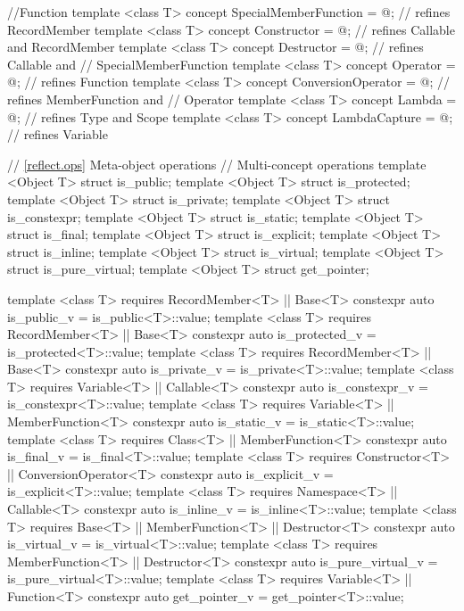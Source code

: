 \begin{std.txt}
\begin{codeblock}
{{                                                       //Function
template <class T> concept SpecialMemberFunction = @\seebelow@; // refines RecordMember
template <class T> concept Constructor = @\seebelow@;    // refines Callable and RecordMember
template <class T> concept Destructor = @\seebelow@;     // refines Callable and
                                                       // SpecialMemberFunction
template <class T> concept Operator = @\seebelow@;       // refines Function
template <class T> concept ConversionOperator = @\seebelow@; // refines MemberFunction and
                                                           // Operator
template <class T> concept Lambda = @\seebelow@;         // refines Type and Scope
template <class T> concept LambdaCapture = @\seebelow@;  // refines Variable


// \ref{reflect.ops} Meta-object operations
// Multi-concept operations
template <Object T> struct is_public;
template <Object T> struct is_protected;
template <Object T> struct is_private;
template <Object T> struct is_constexpr;
template <Object T> struct is_static;
template <Object T> struct is_final;
template <Object T> struct is_explicit;
template <Object T> struct is_inline;
template <Object T> struct is_virtual;
template <Object T> struct is_pure_virtual;
template <Object T> struct get_pointer;

template <class T>
requires RecordMember<T> || Base<T>
  constexpr auto is_public_v = is_public<T>::value;
template <class T>
requires RecordMember<T> || Base<T>
  constexpr auto is_protected_v = is_protected<T>::value;
template <class T>
requires RecordMember<T> || Base<T>
  constexpr auto is_private_v = is_private<T>::value;
template <class T>
requires Variable<T> || Callable<T>
   constexpr auto is_constexpr_v = is_constexpr<T>::value;
template <class T>
requires Variable<T> || MemberFunction<T>
   constexpr auto is_static_v = is_static<T>::value;
template <class T>
requires Class<T> || MemberFunction<T>
   constexpr auto is_final_v = is_final<T>::value;
template <class T>
requires Constructor<T> || ConversionOperator<T>
   constexpr auto is_explicit_v = is_explicit<T>::value;
template <class T>
requires Namespace<T> || Callable<T>
   constexpr auto is_inline_v = is_inline<T>::value;
template <class T>
requires Base<T> || MemberFunction<T> || Destructor<T>
   constexpr auto is_virtual_v = is_virtual<T>::value;
template <class T>
requires MemberFunction<T> || Destructor<T>
   constexpr auto is_pure_virtual_v = is_pure_virtual<T>::value;
template <class T>
requires Variable<T> || Function<T>
   constexpr auto get_pointer_v = get_pointer<T>::value;

}}
\end{codeblock}
\end{std.txt}
